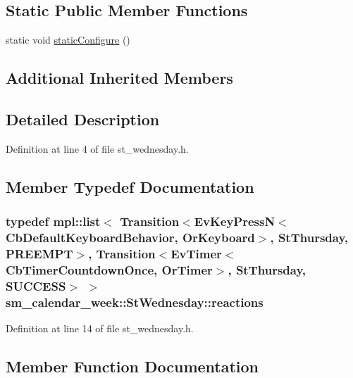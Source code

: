 \subsection*{Static Public Member Functions}
\begin{DoxyCompactItemize}
\item 
static void \hyperlink{structsm__calendar__week_1_1StWednesday_a5e641d0acc42524bac18647f6ab02278}{static\+Configure} ()
\end{DoxyCompactItemize}
\subsection*{Additional Inherited Members}


\subsection{Detailed Description}


Definition at line 4 of file st\+\_\+wednesday.\+h.



\subsection{Member Typedef Documentation}
\subsubsection[{\texorpdfstring{reactions}{reactions}}]{\setlength{\rightskip}{0pt plus 5cm}typedef mpl\+::list$<$ Transition$<$Ev\+Key\+PressN$<$Cb\+Default\+Keyboard\+Behavior, {\bf Or\+Keyboard}$>$, {\bf St\+Thursday}, {\bf P\+R\+E\+E\+M\+PT}$>$, Transition$<$Ev\+Timer$<$Cb\+Timer\+Countdown\+Once, {\bf Or\+Timer}$>$, {\bf St\+Thursday}, {\bf S\+U\+C\+C\+E\+SS}$>$ $>$ {\bf sm\+\_\+calendar\+\_\+week\+::\+St\+Wednesday\+::reactions}}\hypertarget{structsm__calendar__week_1_1StWednesday_aa21e502e00fa09b841f8693bdb05e86d}{}\label{structsm__calendar__week_1_1StWednesday_aa21e502e00fa09b841f8693bdb05e86d}


Definition at line 14 of file st\+\_\+wednesday.\+h.



\subsection{Member Function Documentation}
